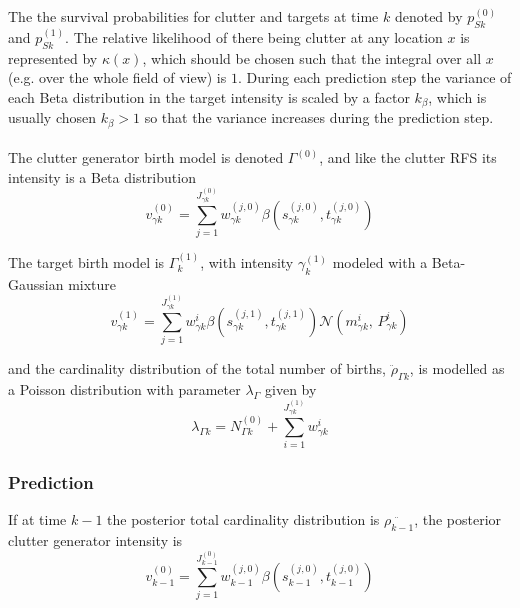 \documentclass{article}
\newcommand{\clut}{{(0)}}
\newcommand{\tgt}{{(1)}}
\begin{document}
The the survival probabilities for clutter and targets at time $k$ denoted by $p_{Sk}^{(0)}$ and $p_{Sk}^{(1)}$. The relative likelihood of there being clutter at any location $x$ is represented by $\kappa(x)$, which should be chosen such that the integral over all $x$ (e.g. over the whole field of view) is $1$. During each prediction step the variance of each Beta distribution in the target intensity is scaled by a factor $k_{\beta}$, which is usually chosen $k_{\beta} > 1$ so that the variance increases during the prediction step.\\
\\
The clutter generator birth model is denoted $\Gamma^{(0)}$, and like the clutter RFS its intensity is a Beta distribution
\begin{equation}
  \label{eq:lpd_clutter_birth}
  v_{\gamma k}^\clut = \sum_{j=1}^{J^\clut _{\gamma k}}w_{\gamma k}^{(j, 0)}\beta(s_{\gamma k}^{(j, 0)}, t_{\gamma k}^{(j, 0)})
\end{equation}

The target birth model is $\Gamma^{(1)}_k$, with intensity $\gamma^{(1)}_k$ modeled with a Beta-Gaussian mixture
\begin{equation}
  \label{eq:lpd_tgt_birth}
    v_{\gamma k}^\tgt = \sum_{j=1}^{J^\tgt _{\gamma k}}w_{\gamma k}^i \beta(s_{\gamma k}^{(j, 1)}, t_{\gamma k}^{(j, 1)})\mathcal{N}(m_{\gamma k}^i,\,P_{\gamma k}^i)
\end{equation}

and the cardinality distribution of the total number of births, $\ddot{\rho}_{\Gamma k}$, is modelled as a Poisson distribution with parameter $\lambda_\Gamma$ given by
\begin{equation}
  \label{eq:lpd_rho_gamma}
\lambda_{\Gamma k} = N_{\Gamma k}^{(0)} + \sum_{i=1}^{J_{\gamma k}^{(1)}}w_{\gamma k}^i 
\end{equation}

\subsubsection*{Prediction}

If at time $k-1$ the posterior total cardinality distribution is $\ddot{\rho_{k-1}}$, the posterior clutter generator intensity is \cite{cphd}
\begin{equation}
  \label{eq:lpd_v0k-1}
  v_{k-1}^\clut = \sum_{j=1}^{J^\clut _{k-1}}w_{k-1}^{(j, 0)}\beta(s_{k-1}^{(j, 0)}, t_{k-1}^{(j, 0)})
\end{equation}
\end{document}

